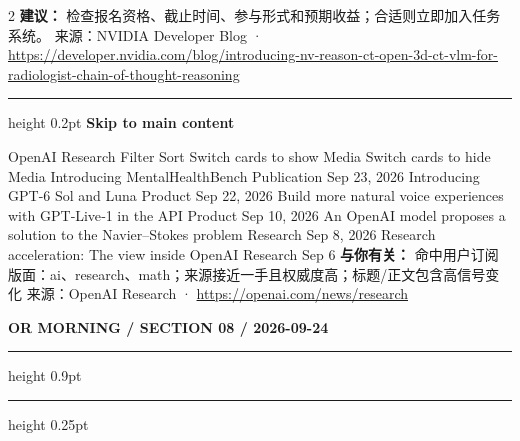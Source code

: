 \documentclass[10.5pt]{ctexart}
\begin{document}
\begin{multicols}{2}
\textbf{建议：} 检查报名资格、截止时间、参与形式和预期收益；合适则立即加入任务系统。
{\footnotesize\color{ormuted} 来源：NVIDIA Developer Blog · \url{https://developer.nvidia.com/blog/introducing-nv-reason-ct-open-3d-ct-vlm-for-radiologist-chain-of-thought-reasoning}}
\vspace{2mm}
\hrule height 0.2pt
\vspace{2mm}
{\large\bfseries Skip to main content}\par
OpenAI Research Filter Sort Switch cards to show Media Switch cards to hide Media Introducing MentalHealthBench Publication Sep 23, 2026 Introducing GPT-6 Sol and Luna Product Sep 22, 2026 Build more natural voice experiences with GPT‑Live‑1 in the API Product Sep 10, 2026 An OpenAI model proposes a solution to the Navier–Stokes problem Research Sep 8, 2026 Research acceleration: The view inside OpenAI Research Sep 6
\textbf{与你有关：} 命中用户订阅版面：ai、research、math；来源接近一手且权威度高；标题/正文包含高信号变化
{\footnotesize\color{ormuted} 来源：OpenAI Research · \url{https://openai.com/news/research}}
\end{multicols}
\newpage
{\small\bfseries OR MORNING / SECTION 08 / 2026-09-24}
\vspace{2mm}
\hrule height 0.9pt
\vspace{1.5mm}
\hrule height 0.25pt
\vspace{4mm}
\end{document}

